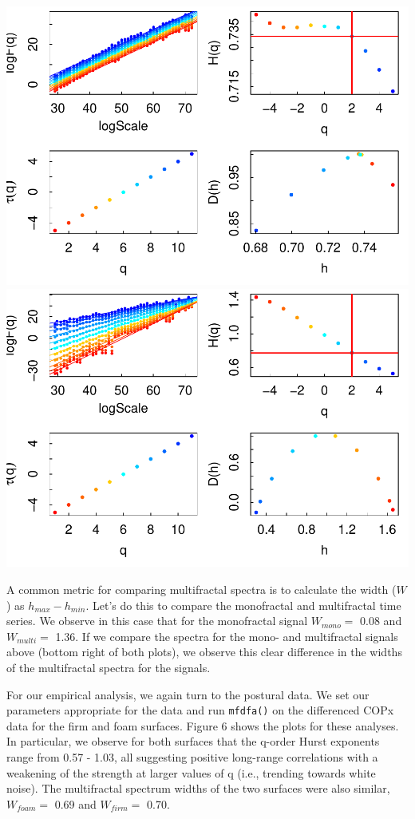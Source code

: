 \documentclass[
  man]{apa6}
\begin{document}
\includegraphics{fractal_regression_paper_brm_files/figure-latex/unnamed-chunk-11-1.pdf} \includegraphics{fractal_regression_paper_brm_files/figure-latex/unnamed-chunk-11-2.pdf}

A common metric for comparing multifractal spectra is to calculate the
width (\(W\)) as \(h_{max} - h_{min}\). Let's do this to compare the
monofractal and multifractal time series. We observe in this case that
for the monofractal signal \(W_{mono} =\)
0.08 and \(W_{multi} =\)
1.36. If we compare the
spectra for the mono- and multifractal signals above (bottom right of
both plots), we observe this clear difference in the widths of the
multifractal spectra for the signals.

For our empirical analysis, we again turn to the postural data. We set
our parameters appropriate for the data and run \texttt{mfdfa()} on the
differenced COPx data for the firm and foam surfaces. Figure 6 shows the
plots for these analyses. In particular, we observe for both surfaces
that the q-order Hurst exponents range from
0.57 -
1.03,
all suggesting positive long-range correlations with a weakening of the
strength at larger values of q (i.e., trending towards white noise). The
multifractal spectrum widths of the two surfaces were also similar,
\(W_{foam} =\)
0.69
and \(W_{firm} =\)
0.70.
\end{document}
